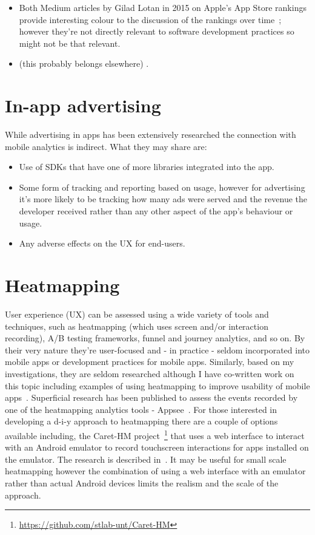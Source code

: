 \begin{itemize}
    
    \item Both Medium articles by Gilad Lotan in 2015 on Apple's App Store rankings provide interesting colour to the discussion of the rankings over time~\citep{lotan2015_apple_apps_and_algorithmic_glitches, lotan2015_apples_app_charts}; however they're not directly relevant to software development practices so might not be that relevant.
    
    \item (this probably belongs elsewhere) \citet{not_cited_yet_necmiye2017_a_slr_opinion_mining_studies_from_mobile_app_store_reviews}. 
    
\end{itemize}


\section{In-app advertising}
While advertising in apps has been extensively researched the connection with mobile analytics is indirect. What they may share are:
\begin{itemize}
    \item Use of SDKs that have one of more libraries integrated into the app.
    \item Some form of tracking and reporting based on usage, however for advertising it's more likely to be tracking how many ads were served and the revenue the developer received rather than any other aspect of the app's behaviour or usage.
    \item Any adverse effects on the UX for end-users.
\end{itemize}


\section{Heatmapping}
User experience (UX) can be assessed using a wide variety of tools and techniques, such as heatmapping (which uses screen and/or interaction recording), A/B testing frameworks, funnel and journey analytics, and so on. By their very nature they're user-focused and - in practice - seldom incorporated into mobile apps or development practices for mobile apps. Similarly, based on my investigations, they are seldom researched although I have co-written work on this topic including examples of using heatmapping to improve usability of mobile apps~\cite{harty_aymer_playbook_2016}. Superficial research has been published to assess the events recorded by one of the heatmapping analytics tools - Appsee~\citep{yildirim2019_ux_analytics_for_android_platforms}. For those interested in developing a d-i-y approach to heatmapping there are a couple of options available including, the Caret-HM project~\footnote{\url{https://github.com/stlab-unt/Caret-HM}} that uses a web interface to interact with an Android emulator to record touchscreen interactions for apps installed on the emulator. The research is described in~\citep{nurmuradov2017_caret-hm-heatmapping-android-emulator}. It may be useful for small scale heatmapping however the combination of using a web interface with an emulator rather than actual Android devices limits the realism and the scale of the approach.


